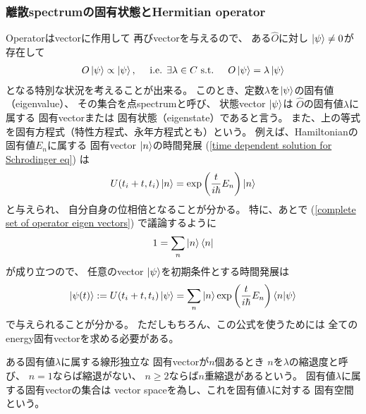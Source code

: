 \subsubsection{離散spectrumの固有状態とHermitian operator}

Operatorはvectorに作用して
再びvectorを与えるので、
ある$\hat{O}$に対し
$\ket{\psi} \neq 0$が存在して
\begin{align}
    O\ket{\psi} \propto \ket{\psi}
,\quad\text{
    i.e.
    $\exists \lambda\in C$
    s.t.
}\quad
    O\ket{\psi} = \lambda \ket{\psi}
\end{align}
となる特別な状況を考えることが出来る。
このとき、定数$\lambda$を$\ket{\psi}$の固有値（eigenvalue）、
その集合を点spectrumと呼び、
状態vector $\ket{\psi}$は
$\hat{O}$の固有値$\lambda$に属する
固有vectorまたは
固有状態（eigenstate）であると言う。
また、上の等式を固有方程式（特性方程式、永年方程式とも）という。
例えば、Hamiltonianの固有値$E_n$に属する
固有vector $\ket{n}$の時間発展
(\ref{time dependent solution for Schrodinger eq})
は
\begin{align}
    U(t_i + t, t_i) \ket{n}
    =
    \exp\left(
        \dfrac{t}{i\hbar} E_n
    \right)
    \ket{n}
\end{align}
と与えられ、
自分自身の位相倍となることが分かる。
特に、あとで
(\ref{complete set of operator eigen vectors})
で議論するように
\begin{align}
    1 = \sum_n \ket{n} \bra{n}
\end{align}
が成り立つので、
任意のvector $\ket{\psi}$を初期条件とする時間発展は
\begin{align}
    \ket{\psi(t)}
    :=
    U(t_i + t, t_i)
    \ket{\psi}
    =
    \sum_n \ket{n}
    \exp\left(
        \dfrac{t}{i\hbar} E_n
    \right)
    \braket{ n | \psi }
\label{eigen decomposition of time independent solution}
\end{align}
で与えられることが分かる。
ただしもちろん、この公式を使うためには
全てのenergy固有vectorを求める必要がある。

ある固有値$\lambda$に属する線形独立な
固有vectorが$n$個あるとき
$n$を$\lambda$の縮退度と呼び、
$n = 1$ならば縮退がない、
$n \ge 2$ならば$n$重縮退があるという。
固有値$\lambda$に属する固有vectorの集合は
vector spaceを為し、これを固有値$\lambda$に対する
固有空間という。

